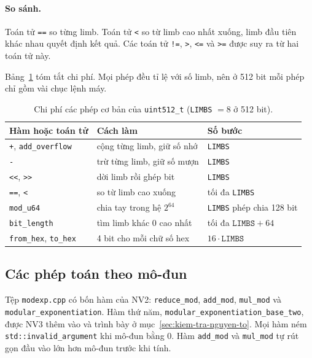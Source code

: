 \paragraph{So sánh.} Toán tử \texttt{==} so từng limb. Toán tử \texttt{<} so từ limb cao nhất xuống, limb đầu tiên khác nhau quyết định kết quả. Các toán tử \texttt{!=}, \texttt{>}, \texttt{<=} và \texttt{>=} được suy ra từ hai toán tử này.

Bảng~\ref{tab:u512-ops} tóm tắt chi phí. Mọi phép đều tỉ lệ với số limb, nên ở 512 bit mỗi phép chỉ gồm vài chục lệnh máy.

\begin{table}[h!]
\centering
\small
\begin{tabular}{lll}
\toprule
\textbf{Hàm hoặc toán tử} & \textbf{Cách làm} & \textbf{Số bước} \\
\midrule
\texttt{+}, \texttt{add\_overflow} & cộng từng limb, giữ số nhớ & \texttt{LIMBS} \\
\texttt{-} & trừ từng limb, giữ số mượn & \texttt{LIMBS} \\
\texttt{<{}<}, \texttt{>{}>} & dời limb rồi ghép bit & \texttt{LIMBS} \\
\texttt{==}, \texttt{<} & so từ limb cao xuống & tối đa \texttt{LIMBS} \\
\texttt{mod\_u64} & chia tay trong hệ $2^{64}$ & \texttt{LIMBS} phép chia 128 bit \\
\texttt{bit\_length} & tìm limb khác 0 cao nhất & tối đa $\texttt{LIMBS} + 64$ \\
\texttt{from\_hex}, \texttt{to\_hex} & 4 bit cho mỗi chữ số hex & $16 \cdot \texttt{LIMBS}$ \\
\bottomrule
\end{tabular}
\caption{Chi phí các phép cơ bản của \texttt{uint512\_t} (\texttt{LIMBS} $= 8$ ở 512 bit).}
\label{tab:u512-ops}
\end{table}

\subsection{Các phép toán theo mô-đun}

Tệp \texttt{modexp.cpp} có bốn hàm của NV2: \texttt{reduce\_mod}, \texttt{add\_mod}, \texttt{mul\_mod} và \texttt{modular\_exponentiation}. Hàm thứ năm, \texttt{modular\_\allowbreak{}exponentiation\_\allowbreak{}base\_\allowbreak{}two}, được NV3 thêm vào và trình bày ở mục~\ref{sec:kiem-tra-nguyen-to}. Mọi hàm ném \texttt{std::invalid\_argument} khi mô-đun bằng 0. Hàm \texttt{add\_mod} và \texttt{mul\_mod} tự rút gọn đầu vào lớn hơn mô-đun trước khi tính.

